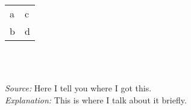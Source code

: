 \centering
\begin{tabularx}{0.5\textwidth}{Y Y}
    a   &   c\\
    b   &   d
\end{tabularx}
\\
\raggedright
\footnotesize
\emph{\\Source:} Here I tell you where I got this.\\
\emph{Explanation:} This is where I talk about it briefly.
